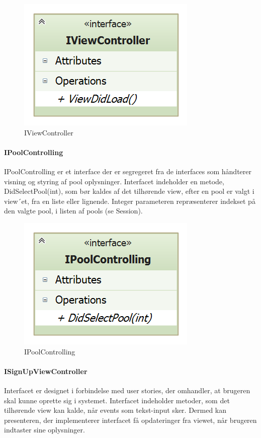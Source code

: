 \begin{figure}
	\centering
	\includegraphics[width=0.3\linewidth]{figs/design/application_iviewcontroller}
	\caption{IViewController}
	\label{fig:application_iviewcontroller}
\end{figure}

\paragraph{IPoolControlling}
IPoolControlling er et interface der er segregeret fra de interfaces som håndterer visning og styring af pool oplysninger. Interfacet indeholder en metode, DidSelectPool(int), som bør kaldes af det tilhørende view, efter en pool er valgt i view´et, fra en liste eller lignende. Integer parameteren repræsenterer indekset på den valgte pool, i listen af pools (se Session).  
\begin{figure}
	\centering
	\includegraphics[width=0.3\linewidth]{figs/design/application_ipoolcontrolling}
	\caption{IPoolControlling}
	\label{fig:application_ipoolcontrolling}
\end{figure}

\paragraph{ISignUpViewController}
Interfacet er designet i forbindelse med user stories, der omhandler, at brugeren skal kunne oprette sig i systemet. Interfacet indeholder metoder, som det tilhørende view kan kalde, når events som tekst-input sker. Dermed kan presenteren, der implementerer interfacet få opdateringer fra viewet, når brugeren indtaster sine oplysninger.

